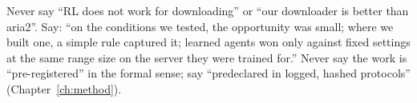 \begin{careful}
Never say ``RL does not work for downloading'' or ``our downloader is better than aria2''. Say: ``on the conditions we tested, the opportunity was small; where we built one, a simple rule captured it; learned agents won only against fixed settings at the same range size on the server they were trained for.'' Never say the work is ``pre-registered'' in the formal sense; say ``predeclared in logged, hashed protocols'' (Chapter~\ref{ch:method}).
\end{careful}
